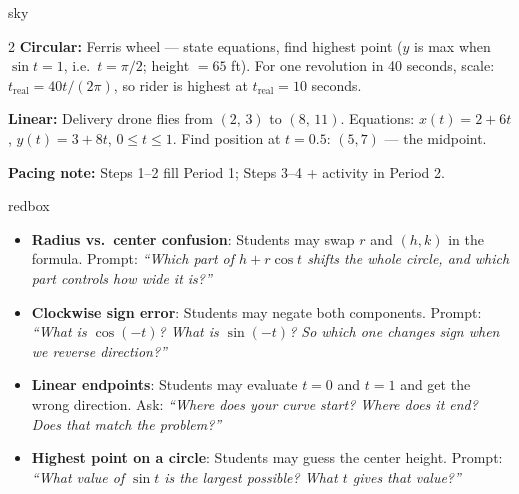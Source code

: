 \documentclass[10pt]{article}
\begin{document}
\begin{skillbox}{sky}
\begin{multicols}{2}
\textbf{Circular:} Ferris wheel --- state equations, find highest point
($y$ is max when $\sin t = 1$, i.e.\ $t = \pi/2$; height $= 65$ ft).
For one revolution in 40 seconds, scale: $t_{\text{real}} = 40t/(2\pi)$,
so rider is highest at $t_{\text{real}} = 10$ seconds.

\textbf{Linear:} Delivery drone flies from $(2,\,3)$ to $(8,\,11)$.
Equations: $x(t) = 2 + 6t$, $y(t) = 3 + 8t$, $0\le t\le 1$.
Find position at $t=0.5$: $(5, 7)$ --- the midpoint.

\end{multicols}

\smallskip
\textbf{Pacing note:} Steps 1--2 fill Period 1; Steps 3--4 + activity in Period 2.
\end{skillbox}

\vspace{0.08in}

\begin{skillbox}{redbox}
\begin{itemize}[leftmargin=1.4em, itemsep=3pt]
  \item \textbf{Radius vs.\ center confusion}: Students may swap $r$
    and $(h,k)$ in the formula. Prompt: \textit{``Which part of
    $h + r\cos t$ shifts the whole circle, and which part controls how
    wide it is?''}
  \item \textbf{Clockwise sign error}: Students may negate both
    components. Prompt: \textit{``What is $\cos(-t)$? What is
    $\sin(-t)$? So which one changes sign when we reverse direction?''}
  \item \textbf{Linear endpoints}: Students may evaluate $t=0$ and $t=1$
    and get the wrong direction. Ask: \textit{``Where does your curve
    start? Where does it end? Does that match the problem?''}
  \item \textbf{Highest point on a circle}: Students may guess the center
    height. Prompt: \textit{``What value of $\sin t$ is the largest
    possible? What $t$ gives that value?''}
\end{itemize}
\end{skillbox}

\vspace{0.08in}
\end{document}
